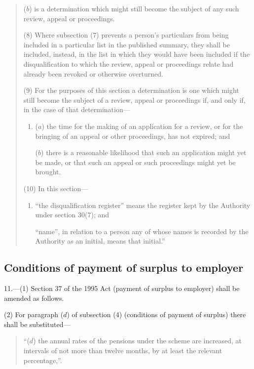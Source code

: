 \documentclass[12pt,a4paper]{article}
\begin{document}
\begin{quotation}
\begin{enumerate}
($b$) is a determination which might still become the subject of any such review, appeal or proceedings.
\end{enumerate}

(8) Where subsection (7)  prevents a person’s particulars from being included in a particular list in the published summary, they shall be included, instead, in the list in which they would have been included if the disqualification to which the review, appeal or proceedings relate had already been revoked or otherwise overturned.

(9) For the purposes of this section a determination is one which might still become the subject of a review, appeal or proceedings if, and only if, in the case of that determination—
\begin{enumerate}\item[]
($a$) the time for the making of an application for a review, or for the bringing of an appeal or other proceedings, has not expired; and

($b$) there is a reasonable likelihood that such an application might yet be made, or that such an appeal or such proceedings might yet be brought.
\end{enumerate}

(10) In this section—
\begin{enumerate}\item[]
    “the disqualification register” means the register kept by the Authority under section 30(7); and

    “name”, in relation to a person any of whose names is recorded by the Authority as an initial, means that initial.” 
\end{enumerate}
\end{quotation}

\subsection*{Conditions of payment of surplus to employer}

11.---(1) Section 37 of the 1995 Act (payment of surplus to employer) shall be amended as follows.

(2) For paragraph ($d$)  of subsection (4)  (conditions of payment of surplus) there shall be substituted—
\begin{quotation}
“($d$) the annual rates of the pensions under the scheme are increased, at intervals of not more than twelve months, by at least the relevant percentage,”.
\end{quotation}
\end{document}
